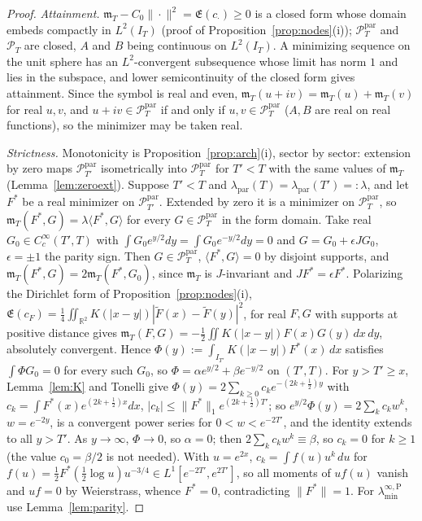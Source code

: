 \documentclass[11pt]{amsart}
\theoremstyle{definition}
\theoremstyle{remark}
\newcommand{\R}{\mathbb R}
\newcommand{\PT}{\mathcal P_T}
\newcommand{\IT}{I_T}
\newcommand{\cF}{c_F}
\newcommand{\Lev}{\mathfrak E}
\newcommand{\mT}{\mathfrak m_T}
\newcommand{\laminfP}{\lambda^{\infty,\mathrm P}_{\min}}
\begin{document}
\begin{proof}
\emph{Attainment.} $\mT-C_0\|\cdot\|^2=\Lev(c_\cdot)\ge0$ is a closed form whose domain embeds
compactly in $L^2(\IT)$ (proof of Proposition~\ref{prop:nodes}(i)); $\PT^{\mathrm{par}}$ and $\PT$ are
closed, $A$ and $B$ being continuous on $L^2(\IT)$. A minimizing sequence on the unit sphere has an
$L^2$-convergent subsequence whose limit has norm $1$ and lies in the subspace, and lower semicontinuity
of the closed form gives attainment. Since the symbol is real and even, $\mT(u+iv)=\mT(u)+\mT(v)$
for real $u,v$, and $u+iv\in\PT^{\mathrm{par}}$ if and only if $u,v\in\PT^{\mathrm{par}}$ ($A,B$ are real on
real functions), so the minimizer may be taken real.

\emph{Strictness.} Monotonicity is Proposition~\ref{prop:arch}(i), sector by sector: extension by zero
maps $\mathcal P^{\mathrm{par}}_{T'}$ isometrically into $\PT^{\mathrm{par}}$ for $T'<T$ with the same
values of $\mT$ (Lemma~\ref{lem:zeroext}). Suppose $T'<T$ and
$\lambda_{\mathrm{par}}(T)=\lambda_{\mathrm{par}}(T')=:\lambda$, and let $F^*$ be a real minimizer on
$\mathcal P^{\mathrm{par}}_{T'}$. Extended by zero it is a minimizer on $\PT^{\mathrm{par}}$, so
$\mT(F^*,G)=\lambda\langle F^*,G\rangle$ for every $G\in\PT^{\mathrm{par}}$ in the form domain. Take
real $G_0\in C_c^\infty(T',T)$ with $\int G_0e^{y/2}dy=\int G_0e^{-y/2}dy=0$ and $G=G_0+\epsilon JG_0$,
$\epsilon=\pm1$ the parity sign. Then $G\in\PT^{\mathrm{par}}$, $\langle F^*,G\rangle=0$ by disjoint
supports, and $\mT(F^*,G)=2\mT(F^*,G_0)$, since $\mT$ is $J$-invariant and
$JF^*=\epsilon F^*$. Polarizing the Dirichlet form of Proposition~\ref{prop:nodes}(i),
$\Lev(\cF)=\frac14\iint_{\R^2}K(|x-y|)|\widetilde F(x)-\widetilde F(y)|^2$, for real $F,G$ with
supports at positive distance gives
$\mT(F,G)=-\frac12\iint K(|x-y|)F(x)G(y)\,dx\,dy$, absolutely convergent. Hence
$\Phi(y):=\int_{I_{T'}}K(|x-y|)F^*(x)\,dx$ satisfies $\int\Phi G_0=0$ for every such $G_0$, so
$\Phi=\alpha e^{y/2}+\beta e^{-y/2}$ on $(T',T)$. For $y>T'\ge x$, Lemma~\ref{lem:K} and Tonelli give
$\Phi(y)=2\sum_{k\ge0}c_ke^{-(2k+\frac12)y}$ with $c_k=\int F^*(x)e^{(2k+\frac12)x}dx$,
$|c_k|\le\|F^*\|_1e^{(2k+\frac12)T'}$; so $e^{y/2}\Phi(y)=2\sum_kc_kw^k$, $w=e^{-2y}$, is a convergent
power series for $0<w<e^{-2T'}$, and the identity extends to all $y>T'$. As $y\to\infty$, $\Phi\to0$,
so $\alpha=0$; then $2\sum_kc_kw^k\equiv\beta$, so $c_k=0$ for $k\ge1$ (the value $c_0=\beta/2$ is not
needed). With $u=e^{2x}$, $c_k=\int f(u)u^k\,du$ for
$f(u)=\frac12F^*(\frac12\log u)u^{-3/4}\in L^1[e^{-2T'},e^{2T'}]$, so all moments of $uf(u)$ vanish and
$uf=0$ by Weierstrass, whence $F^*=0$, contradicting $\|F^*\|=1$. For $\laminfP$ use Lemma~\ref{lem:parity}.


\end{proof}
\end{document}
